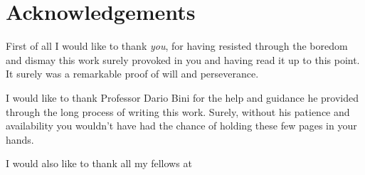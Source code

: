 \chapter{Acknowledgements}
First of all I would like to thank \emph{you}, for having resisted through the boredom and dismay this work surely provoked in you and having read it up to this point. It surely was a remarkable proof of will and perseverance.

I would like to thank Professor Dario Bini for the help and guidance he provided through the long process of writing this work. Surely, without his patience and availability you wouldn't have had the chance of holding these few pages in your hands.

I would also like to thank all my fellows at 